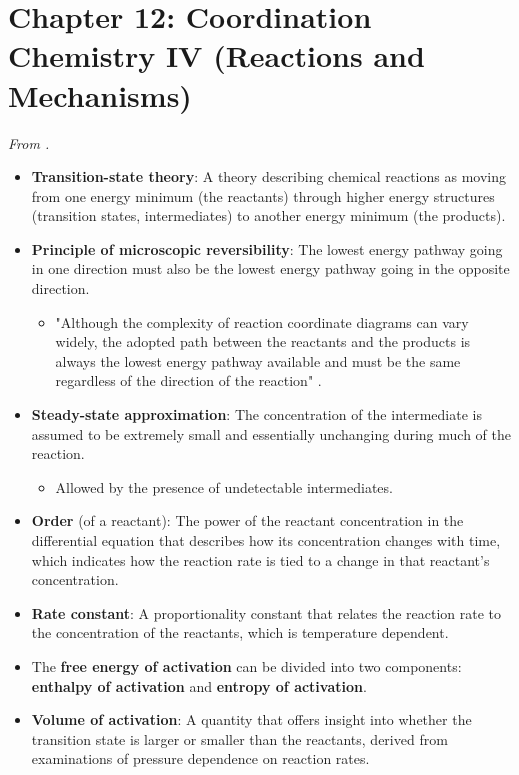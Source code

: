 \documentclass[../notes.tex]{subfiles}
\begin{document}
\section{Chapter 12: Coordination Chemistry IV (Reactions and Mechanisms)}
\emph{From \textcite{bib:MiesslerFischerTarr}.}
\begin{itemize}
    \item {}\textbf{Transition-state theory}: A theory describing chemical reactions as moving from one energy minimum (the reactants) through higher energy structures (transition states, intermediates) to another energy minimum (the products).
    \item \textbf{Principle of microscopic reversibility}: The lowest energy pathway going in one direction must also be the lowest energy pathway going in the opposite direction.
    \begin{itemize}
        \item "Although the complexity of reaction coordinate diagrams can vary widely, the adopted path between the reactants and the products is always the lowest energy pathway available and must be the same regardless of the direction of the reaction" \parencite[437-38]{bib:MiesslerFischerTarr}.
    \end{itemize}
    \item \textbf{Steady-state approximation}: The concentration of the intermediate is assumed to be extremely small and essentially unchanging during much of the reaction.
    \begin{itemize}
        \item Allowed by the presence of undetectable intermediates.
    \end{itemize}
    \item \textbf{Order} (of a reactant): The power of the reactant concentration in the differential equation that describes how its concentration changes with time, which indicates how the reaction rate is tied to a change in that reactant's concentration.
    \item \textbf{Rate constant}: A proportionality constant that relates the reaction rate to the concentration of the reactants, which is temperature dependent.
    \item The \textbf{free energy of activation} can be divided into two components: \textbf{enthalpy of activation} and \textbf{entropy of activation}.
    \item \textbf{Volume of activation}: A quantity that offers insight into whether the transition state is larger or smaller than the reactants, derived from examinations of pressure dependence on reaction rates.

\end{itemize}
\end{document}
